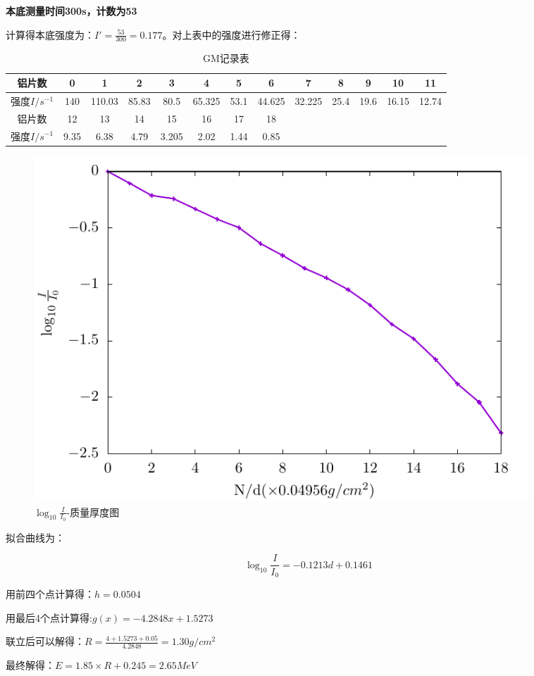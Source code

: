 \documentclass[a4paper,UTF8]{ctexart}
\begin{document}
{\bfseries{本底测量时间300s，计数为53}}

计算得本底强度为：$I' = \frac{53}{300} = 0.177$。对上表中的强度进行修正得：

\begin{table}[H]
    \centering
    \begin{tabular}{|c|c|c|c|c|c|c|c|c|c|c|c|c|}
    \hline
        铝片数 & 0 & 1 & 2 & 3 & 4 & 5 & 6 & 7 & 8 & 9 & 10 & 11 \\ \hline
        强度$I/s^{-1}$ & 140 & 110.03 & 85.83 & 80.5 & 65.325 & 53.1 & 44.625 & 32.225 & 25.4 & 19.6 & 16.15 & 12.74 \\ \hline
        铝片数 & 12 & 13 & 14 & 15 & 16 & 17 & 18 & ~ & ~ & ~ & ~ & ~ \\ \hline
        强度$I/s^{-1}$ & 9.35 & 6.38 & 4.79 & 3.205 & 2.02 & 1.44 & 0.85 & ~ & ~ & ~ & ~ & ~ \\ \hline
    \end{tabular}
    \caption{GM记录表}
\end{table}

\begin{figure}[H]
    \centering
    \begin{minipage}[b]{0.9\textwidth}
        \centering
        \includegraphics[width=0.9\textwidth]{./fig2.pdf}
        \caption{$\log_{10}{\frac{I}{I_0}}$-质量厚度图}
    \end{minipage}
\end{figure}

拟合曲线为：

\begin{equation}
    \log_{10}{\frac{I}{I_0}} = -0.1213 d + 0.1461
\end{equation}

用前四个点计算得：$h = 0.0504$

用最后4个点计算得:$g(x) = -4.2848 x + 1.5273$

联立后可以解得：$R = \frac{4+1.5273+0.05}{4.2848} = 1.30 g/cm^2$

最终解得：$E = 1.85 \times R + 0.245 = 2.65 MeV$
\end{document}
